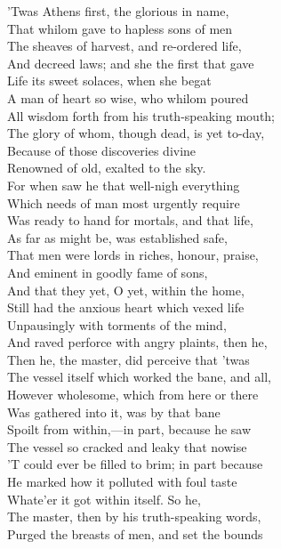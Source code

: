 'Twas Athens first, the glorious in name,\\
That whilom gave to hapless sons of men\\
The sheaves of harvest, and re-ordered life,\\
And decreed laws; and she the first that gave\\
Life its sweet solaces, when she begat\\
A man of heart so wise, who whilom poured\\
All wisdom forth from his truth-speaking mouth;\\
The glory of whom, though dead, is yet to-day,\\
Because of those discoveries divine\\
Renowned of old, exalted to the sky.\\
For when saw he that well-nigh everything\\
Which needs of man most urgently require\\
Was ready to hand for mortals, and that life,\\
As far as might be, was established safe,\\
That men were lords in riches, honour, praise,\\
And eminent in goodly fame of sons,\\
And that they yet, O yet, within the home,\\
Still had the anxious heart which vexed life\\
Unpausingly with torments of the mind,\\
And raved perforce with angry plaints, then he,\\
Then he, the master, did perceive that 'twas\\
The vessel itself which worked the bane, and all,\\
However wholesome, which from here or there\\
Was gathered into it, was by that bane\\
Spoilt from within,—in part, because he saw\\
The vessel so cracked and leaky that nowise\\
'T could ever be filled to brim; in part because\\
He marked how it polluted with foul taste\\
Whate'er it got within itself. So he,\\
The master, then by his truth-speaking words,\\
Purged the breasts of men, and set the bounds\\
